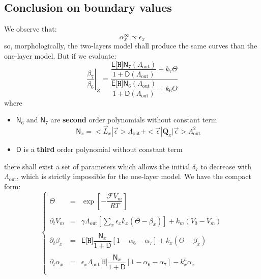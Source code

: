 \documentclass[aps,onecolumn,11pt]{revtex4}
\newcommand{\mychem}[1]{\mathtt{#1}}
\newcommand{\myconc}[1]{\big[#1\big]}
\newcommand{\Faraday}{\mathcal{F}}
\newcommand{\spproton}{\mychem{H}}
\newcommand{\proton}{\myconc{\spproton}}
\newcommand{\myout}[1]{{#1}_{\mathrm{out}}}
\newcommand{\mymat}[1]{{\bm{#1}}}
\newcommand{\LiAll}{\Lambda}
\newcommand{\LiAllOut}{\myout{\LiAll}}
\begin{document}
\subsection{Conclusion on boundary values}
We observe that:
\begin{equation}
\alpha_x^\infty \propto \epsilon_x
\end{equation}
so, morphologically, the two-layers model shall produce the same curves than the one-layer model.
But if we evaluate:
\begin{equation}
	\left.\dfrac{\beta_7}{\beta_6}\right\vert_\varnothing = 
	\dfrac{ \dfrac{\mathsf{E}\proton\mathsf{N}_7(\LiAllOut)}{1+\mathsf{D}(\LiAllOut)}+k_7 \Theta}
	{  \dfrac{\mathsf{E}\proton\mathsf{N}_6(\LiAllOut)}{1+\mathsf{D}(\LiAllOut)} +k_6 \Theta}
\end{equation}
where
\begin{itemize}
\item ${\mathsf{N}_6}$ and  ${\mathsf{N}_7}$ are  {\bf second} order polynomials without constant term
\begin{equation}
\mathsf{N}_x = <\vec{L}_x|\vec{\epsilon}> \LiAllOut + <\vec{\epsilon}|\mymat{Q}_x|\vec{\epsilon}>\LiAllOut^2
\end{equation}
\item ${\mathsf{D}}$ is a {\bf third } order polynomial without constant term
\end{itemize}
there shall exist a set of parameters which allows the initial $\delta_7$ to decrease with $\LiAllOut$, which is
strictly impossible for the one-layer model.
We have the compact form:
\begin{equation}
\boxed{
\left\lbrace
\begin{array}{rcl}
	\Theta & = & \exp\left[ -\dfrac{\Faraday V_m}{RT}\right]\\
	\\
	\partial_t V_m & = & \gamma\LiAllOut \left[\sum_x \epsilon_x k_x \left( \Theta -\beta_x \right)  \right] + k_m\left(V_0-V_m\right)\\
	\\
	\partial_t \beta_x  & = & \mathsf{E}\proton \dfrac{\mathsf{N}_x}{1+\mathsf{D}} \left[ 1-\alpha_6-\alpha_7\right] + k_x \left(\Theta-\beta_x\right)\\
	\\
	\partial_t \alpha_x & = & \epsilon_x \LiAllOut \proton \dfrac{\mathsf{N}_x}{1+\mathsf{D}} \left[ 1-\alpha_6-\alpha_7\right] - k^h_x \alpha_x \\
\end{array}
\right.
}
\end{equation}
\end{document}
